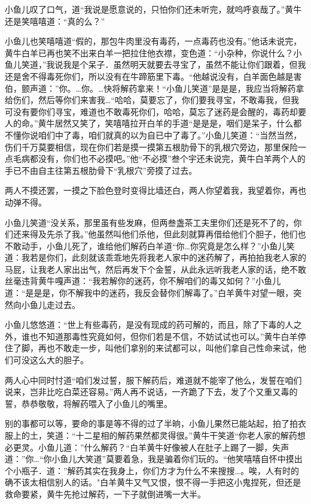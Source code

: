 \documentclass[12pt,oneside]{book}
\begin{document}
小鱼儿叹了口气，道``我说是愿意说的，只怕你们还未听完，就呜呼哀哉了。''黄牛还是笑嘻嘻道：``真的么？''

小鱼儿也笑嘻嘻道``假的，那包牛肉里没有毒药，一点毒药也没有。''他话未说完，黄牛白羊已再也笑不出来白羊一把拉住他衣襟，变色道：``小杂种，你说什么？小鱼儿笑道，''我说我是个呆子．虽然明天就要去寻宝了，虽然不能让你们跟着，但我还是舍不得毒死你们，所以没有在牛蹄筋里下毒。``他越说没有，白羊面色越是害伯，颤声道：''你。\ldots 你。\ldots 快将解药拿来！``小鱼儿笑道''是是是，我应当将解药拿给伤们，然后等你们来害我\ldots{}``哈哈，莫要忘了，你们要我寻宝，不敢毒我，但我可没有要你们寻宝，难道也不敢毒死你们，哈哈，莫忘了迷药是会醒的，毒药却要人的命。''黄牛居然又笑了，笑嘻嘻拉开白羊的手道``是是是，咽们是呆子，什么都不懂你说咱们中了毒，咱们就真的以为自已中了毒了。''小鱼儿笑道：``当然当然，伤们千万莫要相信，现在你们若是摸一摸第五根肋骨下的乳根穴旁边，那里保险一点毛病都没有，你们也不必摸吧。''他``不必摸''叁个宇还未说完，黄牛白羊两个人的手已不由自主往第五根肋骨下``乳根穴''旁摸了过去。

两人不摸还罢，一摸之下脸色登时变得比墙还白，两人你望着我，我望着你，再也动弹不得。

小鱼儿笑道``没关系，那里虽有些发麻，但两叁盏茶工夫里你们还是死不了的，你们还来得及先杀了我。''他虽然叫他们杀他，但此刻就算再借给他们个胆子，他们也不敢动手，小鱼儿死了，谁给他们解药白羊道``你\ldots 你究竟是怎么样？''小鱼儿笑道：我若是你们，此刻就该乖乖地先将我老人家中的迷药解了，再拍拍我老人家的马屁，让我老人家出出气，然后再发下个金誓，从此永远听我老人家的话，绝不敢丝毫违背黄牛嘎声道：``我若解你的迷药，你不解咱们的毒又如何？''小鱼儿道：``是是是，你不解我中的迷药，我反会替你们解毒了。''白羊黄牛对望一眼，突然向小鱼儿走过去。

小鱼儿悠悠道：``世上有些毒药，是没有现成的药可解的，而且，除了下毒的人之外，谁也不知道那毒性究竟如何，但你们若是不信，不妨试试也可以。''黄牛白羊停住了脚，再也不敢走一步，叫他们拿别的来试都可以，叫他们拿自己性命来试，他们可没这么大的胆子。

两人心中同时忖道``咱们发过誓，服下解药后，难道就不能宰了他么，发誓在咱们说来，岂非比吃白菜还容易。''两人再不说话，一齐跪了下去，发了个又重又毒的誓，恭恭敬敬，将解药喂入了小鱼儿的嘴里。

别的事都可以等，要命的事是等不得的过了半晌，小鱼儿果然已能站起，拍了拍衣服上的土，笑道：``十二星相的解药果然都灵得很。''黄牛干笑道``你老人家的解药想必更灵。小鱼儿道：''什么解药？``白羊黄牛好像被人在肚子上踢了一脚，失声道：''你\ldots{}``你小鱼儿大笑道''莫要着急，我是骗着你们玩的。``他笑嘻嘻自怀中摸出个小瓶子．道：''解药其实在我身上，你们方才为什么不来搜搜\ldots。唉，人有时的确不该太相信别人的话。"白羊黄牛又气又恨，恨不得一手把这小鬼捏死，但还是救命要紧，黄牛先抢过解药，一下子就倒进嘴一大半。
\end{document}
